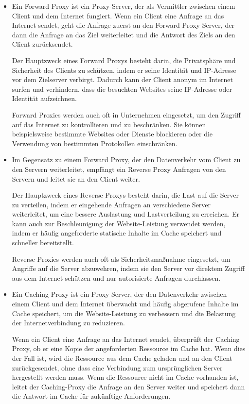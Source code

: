 \begin{itemize}
\item Ein Forward Proxy ist ein Proxy-Server, der als Vermittler zwischen einem Client und dem Internet fungiert. Wenn ein Client eine Anfrage an das Internet sendet, geht die Anfrage zuerst an den Forward Proxy-Server, der dann die Anfrage an das Ziel weiterleitet und die Antwort des Ziels an den Client zurücksendet.

Der Hauptzweck eines Forward Proxys besteht darin, die Privatsphäre und Sicherheit des Clients zu schützen, indem er seine Identität und IP-Adresse vor dem Zielserver verbirgt. Dadurch kann der Client anonym im Internet surfen und verhindern, dass die besuchten Websites seine IP-Adresse oder Identität aufzeichnen.

Forward Proxies werden auch oft in Unternehmen eingesetzt, um den Zugriff auf das Internet zu kontrollieren und zu beschränken. Sie können beispielsweise bestimmte Websites oder Dienste blockieren oder die Verwendung von bestimmten Protokollen einschränken.
\item Im Gegensatz zu einem Forward Proxy, der den Datenverkehr vom Client zu den Servern weiterleitet, empfängt ein Reverse Proxy Anfragen von den Servern und leitet sie an den Client weiter.

Der Hauptzweck eines Reverse Proxys besteht darin, die Last auf die Server zu verteilen, indem er eingehende Anfragen an verschiedene Server weiterleitet, um eine bessere Auslastung und Lastverteilung zu erreichen. Er kann auch zur Beschleunigung der Website-Leistung verwendet werden, indem er häufig angeforderte statische Inhalte im Cache speichert und schneller bereitstellt.

Reverse Proxies werden auch oft als Sicherheitsmaßnahme eingesetzt, um Angriffe auf die Server abzuwehren, indem sie den Server vor direktem Zugriff aus dem Internet schützen und nur autorisierte Anfragen durchlassen.

\item Ein Caching Proxy ist ein Proxy-Server, der den Datenverkehr zwischen einem Client und dem Internet überwacht und häufig abgerufene Inhalte im Cache speichert, um die Website-Leistung zu verbessern und die Belastung der Internetverbindung zu reduzieren.

Wenn ein Client eine Anfrage an das Internet sendet, überprüft der Caching Proxy, ob er eine Kopie der angeforderten Ressource im Cache hat. Wenn dies der Fall ist, wird die Ressource aus dem Cache geladen und an den Client zurückgesendet, ohne dass eine Verbindung zum ursprünglichen Server hergestellt werden muss. Wenn die Ressource nicht im Cache vorhanden ist, leitet der Caching-Proxy die Anfrage an den Server weiter und speichert dann die Antwort im Cache für zukünftige Anforderungen.


\end{itemize}
